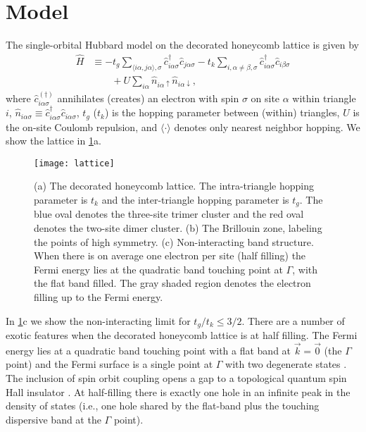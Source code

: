 \documentclass[reprint,aps,prb,amsmath,amssymb]{revtex4-2}
\begin{document}
\section{Model}

The single-orbital Hubbard model on the decorated honeycomb lattice is given by
%
\begin{align} \label{eq:hubbard}
\hat{H} & \equiv -t_g \sum_{\langle i\alpha, j\alpha\rangle,\sigma} \hat{c}_{i\alpha\sigma}^{\dagger} \hat{c}_{j\alpha\sigma}^{} - t_k \sum_{i,\alpha \neq \beta, \sigma} \hat{c}_{i\alpha\sigma}^{\dagger} \hat{c}_{i\beta\sigma}^{} \nonumber \\
& \qquad  + U \sum_{i\alpha} \hat{n}_{i\alpha\uparrow} \hat{n}_{i\alpha\downarrow},
\end{align}
%
where $\hat{c}_{i\alpha\sigma}^{(\dagger)}$ annihilates (creates) an electron with spin $\sigma$ on site $\alpha$ within triangle $i$, $\hat{n}_{i\alpha\sigma} \equiv \hat{c}_{i\alpha\sigma}^{\dagger} \hat{c}_{i\alpha\sigma}^{}$, $t_g$ ($t_k$) is the hopping parameter between (within) triangles, $U$ is the on-site Coulomb repulsion, and $\langle \cdot \rangle$ denotes only nearest neighbor hopping. We show the lattice in \cref{fig:lattice}a. 

\begin{figure}
	\centering
	\texttt{[image: lattice]}
	\caption
	{\label{fig:lattice}
		(a) The decorated honeycomb lattice. The intra-triangle hopping parameter is $t_k$ and the inter-triangle hopping parameter is $t_g$. The blue oval denotes the three-site trimer cluster and the red oval denotes the two-site dimer cluster. (b) The Brillouin zone, labeling the points of high symmetry. (c) Non-interacting band structure. When there is on average one electron per site (half filling) the Fermi energy lies at the quadratic band touching point at $\Gamma$, with the flat band filled. The gray shaded region denotes the electron filling up to the Fermi energy.
	}
\end{figure}

In \cref{fig:lattice}c we show the non-interacting limit for $t_g/t_k \le 3/2$. There are a number of exotic features when the decorated honeycomb lattice is at half filling. The Fermi energy lies at a quadratic band touching point with a flat band at $\vec{k} = \vec{0}$ (the $\Gamma$ point) and the Fermi surface is a single point at $\Gamma$ with two degenerate states \cite{Bergman2008,Jacko2015}. The inclusion of spin orbit coupling opens a gap to a topological quantum spin Hall insulator \cite{Ruegg2010}. At half-filling there is exactly one hole in an infinite peak in the density of states (i.e., one hole shared by the flat-band plus the touching dispersive band at the $\Gamma$ point).
\end{document}
